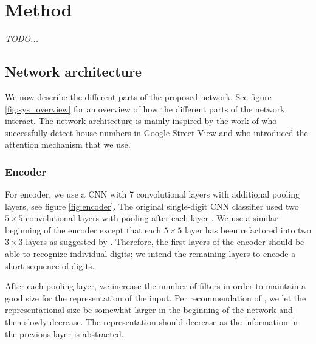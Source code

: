 \chapter{Method}

\textit{TODO...}

\section{Network architecture}



We now describe the different parts of the proposed network. See figure \ref{fig:sys_overview} for an overview of how the different parts of the network interact.
The network architecture is mainly inspired by the work of \textcite{multidigit_streetview} who successfully detect house numbers in Google Street View and \textcite{AttendAndTell} who introduced the attention mechanism that we use.

\subsection{Encoder}



For encoder, we use a CNN with 7 convolutional layers with additional pooling layers, see figure \ref{fig:encoder}.
The original single-digit CNN classifier used two $5 \times 5$ convolutional layers with pooling after each layer \cite{lecun_1989}.
We use a similar beginning of the encoder except that each $5 \times 5$ layer has been refactored into two $3 \times 3$ layers as suggested by \textcite{InceptionV3}. Therefore, the first layers of the encoder should be able to recognize individual digits; we intend the remaining layers to encode a short sequence of digits.


After each pooling layer, we increase the number of filters in order to maintain a good size for the representation of the input. Per recommendation of \textcite{InceptionV3}, we let the representational size be somewhat larger in the beginning of the network and then slowly decrease. The representation should decrease as the information in the previous layer is abstracted.


